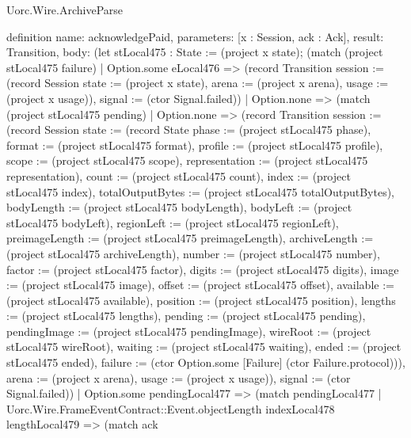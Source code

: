 \begin{lexlean}{Uorc.Wire.ArchiveParse}
\begin{semanticmodule}
definition{
  name: acknowledgePaid,
  parameters: [x : Session, ack : Ack],
  result: Transition,
  body: (let stLocal475 : State := (project x state); (match (project stLocal475 failure)
    | Option.some eLocal476 => (record Transition {session := (record Session {state := (project x state), arena := (project x arena), usage := (project x usage)}), signal := (ctor Signal.failed)})
    | Option.none => (match (project stLocal475 pending)
      | Option.none => (record Transition {session := (record Session {state := (record State {phase := (project stLocal475 phase), format := (project stLocal475 format), profile := (project stLocal475 profile), scope := (project stLocal475 scope), representation := (project stLocal475 representation), count := (project stLocal475 count), index := (project stLocal475 index), totalOutputBytes := (project stLocal475 totalOutputBytes), bodyLength := (project stLocal475 bodyLength), bodyLeft := (project stLocal475 bodyLeft), regionLeft := (project stLocal475 regionLeft), preimageLength := (project stLocal475 preimageLength), archiveLength := (project stLocal475 archiveLength), number := (project stLocal475 number), factor := (project stLocal475 factor), digits := (project stLocal475 digits), image := (project stLocal475 image), offset := (project stLocal475 offset), available := (project stLocal475 available), position := (project stLocal475 position), lengths := (project stLocal475 lengths), pending := (project stLocal475 pending), pendingImage := (project stLocal475 pendingImage), wireRoot := (project stLocal475 wireRoot), waiting := (project stLocal475 waiting), ended := (project stLocal475 ended), failure := (ctor Option.some [Failure] (ctor Failure.protocol))}), arena := (project x arena), usage := (project x usage)}), signal := (ctor Signal.failed)})
      | Option.some pendingLocal477 => (match pendingLocal477
        | Uorc.Wire.FrameEventContract::Event.objectLength indexLocal478 lengthLocal479 => (match ack
}
\end{semanticmodule}
\end{lexlean}
